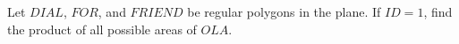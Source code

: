 Let $DIAL$, $FOR$, and $FRIEND$ be regular polygons in the plane. If $ID=1$, find the product of all possible areas of $OLA$.

